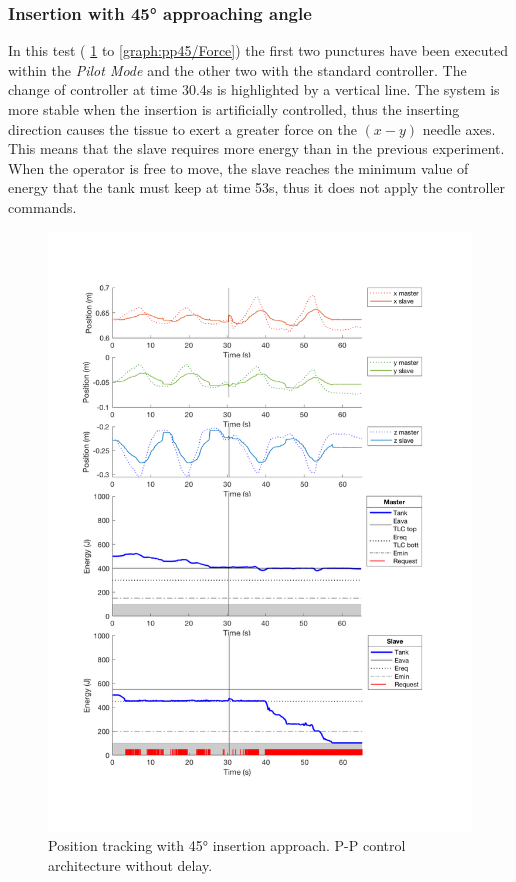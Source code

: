 \subsubsection{Insertion with 45° approaching angle}
In this test (\figurename{ \ref{graph:pp45/Position} to \ref{graph:pp45/Force}}) the first two punctures have been executed within the \textit{Pilot Mode} and the other two with the standard controller.
The change of controller at time 30.4s is highlighted by a vertical line.
The system is more stable when the insertion is artificially controlled, thus the inserting direction causes the tissue to exert a greater force on the $(x-y)$ needle axes. This means that the slave requires more energy than in the previous experiment.
When the operator is free to move, the slave reaches the minimum value of energy that the tank must keep at time 53s, thus it does not apply the controller commands.
\begin{center}
	\begin{figure}
		\includegraphics[width=\textwidth, keepaspectratio]{plots/pp45/Position.pdf}
		\caption{Position tracking with 45° insertion approach. P-P control architecture without delay.}
		\label{graph:pp45/Position}
	\end{figure}
\end{center}
